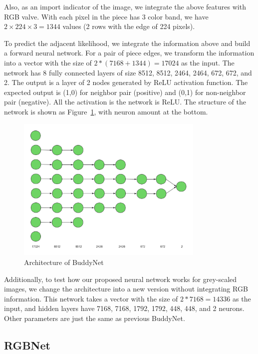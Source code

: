 \documentclass{article}
\begin{document}
Also, as an import indicator of the image, we integrate the above features with RGB valve. With each pixel in the piece has 3 color band, we have $2\times 224\times 3=1344$ values (2 rows with the edge of 224 pixels).

To predict the adjacent likelihood, we integrate the information above and build a forward neural network. For a pair of piece edges, we transform the information into a vector with the size of $2*(7168+1344)=17024$ as the input. The network has 8 fully connected layers of size 8512, 8512, 2464, 2464, 672, 672, and 2. The output is a layer of 2 nodes generated by ReLU activation function. The expected output is (1,0) for neighbor pair (positive) and (0,1) for non-neighbor pair (negative). All the activation is the network is ReLU. The structure of the network is shown as Figure~\ref{fig:buddynet}, with neuron amount at the bottom.

\begin{figure}
    \centering
    \includegraphics[width=0.8\textwidth]{BuddyNet}
    \caption{Architecture of BuddyNet}
    \label{fig:buddynet}
\end{figure}

Additionally, to test how our proposed neural network works for grey-scaled images, we change the architecture into a new version without integrating RGB information. This network takes a vector with the size of $2*7168=14336$ as the input, and hidden layers have 7168, 7168, 1792, 1792, 448, 448, and 2 neurons. Other parameters are just the same as previous BuddyNet.

\subsection{RGBNet}
\end{document}
